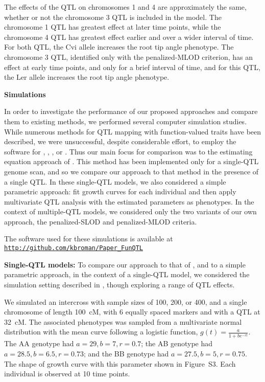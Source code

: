 \documentclass[12pt,letterpaper]{article}
\begin{document}
The effects of the QTL on chromosomes 1 and 4 are approximately the
same, whether or not the chromosome 3 QTL is included in the model.
The chromosome 1 QTL has greatest effect at later time points, while
the chromosome 4 QTL has greatest effect earlier and over a wider
interval of time.  For both QTL, the Cvi allele increases the root tip
angle phenotype.
The chromosome 3 QTL, identified only with the penalized-MLOD
criterion, has an effect at early time points, and only for a brief
interval of time, and for this QTL, the Ler allele increases the root tip
angle phenotype.

\clearpage

\centerline{\sffamily \textbf{Simulations}}

In order to investigate the performance of our proposed approaches and
compare them to existing methods, we performed several computer
simulation studies. While numerous methods for QTL mapping with
function-valued traits have been described, we were unsuccessful,
despite considerable effort, to employ the software for
\citet{Yang2009}, \citet{Yap2009}, \citet{Min2011}, or
\citet{Sillanpaa2012}. Thus our main focus for comparison was to the
estimating equation approach of \citet{Xiong2011}. This method has
been implemented only for a single-QTL genome scan, and so we compare
our approach to that method in the presence of a single QTL.
In these
single-QTL models, we also considered a simple parametric approach:
fit growth curves for each individual \citep{Kahm2010} and then apply
multivariate QTL analysis \citep{Knott2000} with the estimated
parameters as phenotypes. In the context of multiple-QTL models, we
considered only the two variants of our own approach, the
penalized-SLOD and penalized-MLOD criteria.

The software used for these simulations is available at
\href{http://github.com/kbroman/Paper_FunQTL}{\tt http://github.com/kbroman/Paper\_FunQTL}


\textbf{Single-QTL models:}
To compare our approach to that of \citet{Xiong2011}, and to a simple
parametric approach, in the context of
a single-QTL model, we considered the simulation setting described in
\citet{Yap2009}, though exploring a range of QTL effects.

We simulated an intercross with sample sizes of 100, 200, or 400, and a
single chromosome of length 100~cM,
with 6 equally spaced markers and with a QTL at 32~cM. The associated
phenotypes was sampled from a multivariate normal distribution with
the mean curve following a logistic function, $g(t) = \frac{a}{1+b e^{-rt}}$.
The AA genotype had $a=29, b=7, r=0.7$; the AB genotype had $a=28.5,
b=6.5, r=0.73$; and the BB genotype had $a=27.5,
b=5, r=0.75$. The shape of growth curve with this parameter shown in
Figure~S3. Each individual is observed at 10 time
points.
\end{document}
